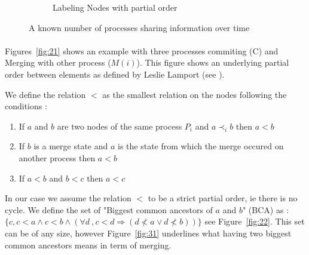 \begin{figure}[H]
\begin{subfigure}[b]{0.3\textwidth}
{
 }
 \caption{Labeling Nodes with partial order}  \label{fig:23}
\end{subfigure}
\caption{A known number of processes sharing information over time}
\end{figure}

\paragraph{} Figures~\ref{fig:21} shows an example with three processes commiting (C) and Merging with other process ($M(i)$). 
This figure shows an underlying partial order between elements as defined by Leslie Lamport (see \cite{DBLP:journals/cacm/Lamport78}). 
\begin{definition} We define the relation $<$ as the smallest relation on the nodes following the conditions :
 \begin{enumerate}
  \item If $a$ and $b$ are two nodes of the same process $P_i$ and $a \prec_i b$ then $a < b$
  \item If $b$ is a merge state and $a$ is the state from which the merge occured on another process then $a<b$
  \item If $a< b$ and $b<c$ then $a<c$ 
 \end{enumerate}
\end{definition}
In our case we assume the relation $<$ to be a strict partial order, ie there is no cycle. We define the set of "Biggest common ancestors of $a$ and $b$" (BCA) as : $\{c, 
c < a 
\wedge 
c < b 
\wedge 
\left ( 
\forall d\ ,
c < d \Rightarrow \left ( d \nless a \vee d \nless b \right )
\right )
\}$ see Figure~\ref{fig:22}. This set can be of any size, however Figure~\ref{fig:31} underlines what having two biggest common ancestors means in term of merging. 
